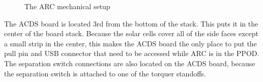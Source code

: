\begin{figure}[!ht]
    \caption{The \acs*{ARC} mechanical setup}
    \label{fig:arcMech}
\end{figure}

The \ac{ACDS} board is located 3rd from the bottom of the stack. This puts it in the center of the board stack. Because the solar cells cover all of the side faces except a small strip in the center, this makes the \ac{ACDS} board the only place to put the pull pin and \ac{USB} connector that need to be accessed while \ac{ARC} is in the \ac{PPOD}. The separation switch connections are also located on the \ac{ACDS} board, because the separation switch is attached to one of the torquer standoffs.

